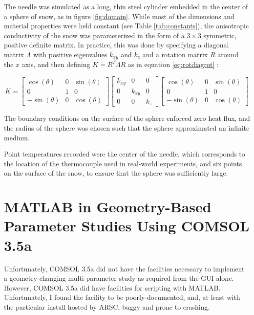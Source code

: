 The needle was simulated as a long, thin steel cylinder embedded in the center
of a sphere of snow, as in figure \ref{fig:domain}. While most of the dimensions and material properties were
held constant (see Table \ref{tab:constants}), the anisotropic conductivity of
the snow was parameterized in the form of a \(3\times3\) symmetric, positive
definite matrix.  In practice, this was done by specifying a diagonal matrix
\(\Lambda\) with positive eigenvalues \(k_{xy}\) and \(k_z\) and a rotation
matrix \(R\) around the \(x\) axis, and then defining \(K = R^T\Lambda R\) as in
equation \ref{eq:rotdiagrot} :

\begin{equation}
\label{eq:rotdiagrot}
K = \begin{bmatrix}
\cos(\theta) & 0 & \sin(\theta)\\
0 & 1 & 0\\
-\sin(\theta) & 0 &\cos(\theta)
\end{bmatrix}
\begin{bmatrix}
k_{xy} & 0 & 0\\
0 & k_{xy} & 0\\
0 & 0 & k_z
\end{bmatrix}
\begin{bmatrix}
\cos(\theta) & 0 & \sin(\theta)\\
0 & 1 & 0\\
-\sin(\theta) & 0 &\cos(\theta)
\end{bmatrix}
\end{equation}

The boundary conditions on the surface of the sphere enforced zero heat flux,
and the radius of the sphere was chosen such that the sphere approximated an
infinite medium.

Point temperatures recorded were the center of the needle, which corresponds to
the location of the thermocouple used in real-world experiments, and six points
on the surface of the snow, to ensure that the sphere was sufficiently large.

\section{MATLAB in Geometry-Based Parameter Studies Using COMSOL 3.5a}
\label{sec:numerical-np:matlab}

Unfortunately, COMSOL 3.5a did not have the facilities necessary to implement a
geometry-changing multi-parameter study as required from the GUI alone. However,
COMSOL 3.5a did have facilities for scripting with MATLAB. Unfortunately, I
found the facility to be poorly-documented, and, at least with the particular
install hosted by ARSC, buggy and prone to crashing.

